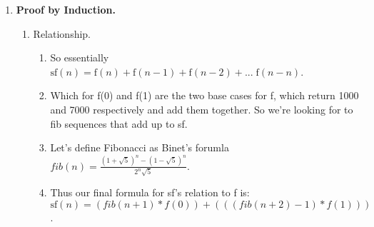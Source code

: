 \documentclass{article}
\begin{document}
\begin{enumerate}
    \item \textbf{Proof by Induction.}
    \begin{enumerate}
      \item Relationship.
      \begin{enumerate}
        \item So essentially $\textrm{sf}(n) = \textrm{f}(n) + \textrm{f}(n - 1) + \textrm{f}(n - 2) + ...\;\textrm{f}(n - n)$.
        \item Which for f(0) and f(1) are the two base cases for f, which return 1000 and 7000 respectively and add them together. So we're looking for to fib sequences that add up to sf.
        \item Let's define Fibonacci as Binet's forumla $fib(n) = \frac{(1+\sqrt{5})^n-(1-\sqrt{5})^n}{2^n \sqrt{5}}$.
        \item Thus our final formula for sf's relation to f is:\\ $\textrm{sf}(n) = (fib(n + 1) * f(0)) + (((fib(n + 2) - 1) * f(1)))$.
      \end{enumerate}
      

\end{enumerate}
\end{enumerate}
\end{document}
